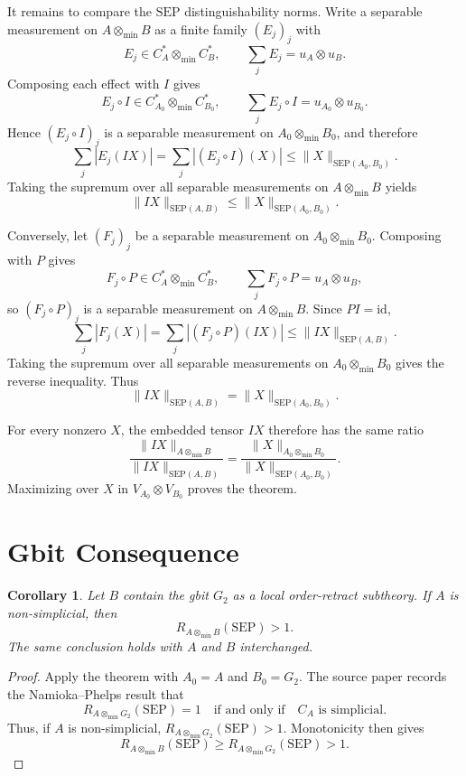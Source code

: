 \documentclass[11pt]{article}
\newtheorem{corollary}{Corollary}
\newcommand{\SEP}{\mathrm{SEP}}
\newcommand{\id}{\mathrm{id}}
\newcommand{\tmin}{\otimes_{\min}}
\newcommand{\Gbit}{G_2}
\begin{document}
It remains to compare the \(\SEP\) distinguishability norms.  Write a
separable measurement on \(A\tmin B\) as a finite family
\((E_j)_j\) with
\[
  E_j\in C_A^*\tmin C_B^*,
  \qquad
  \sum_j E_j=u_A\otimes u_B.
\]
Composing each effect with \(I\) gives
\[
  E_j\circ I \in C_{A_0}^*\tmin C_{B_0}^*,
  \qquad
  \sum_j E_j\circ I=u_{A_0}\otimes u_{B_0}.
\]
Hence \((E_j\circ I)_j\) is a separable measurement on
\(A_0\tmin B_0\), and therefore
\[
  \sum_j |E_j(I X)|
  =
  \sum_j |(E_j\circ I)(X)|
  \le \|X\|_{\SEP(A_0,B_0)}.
\]
Taking the supremum over all separable measurements on \(A\tmin B\) yields
\[
  \|I X\|_{\SEP(A,B)}
  \le
  \|X\|_{\SEP(A_0,B_0)}.
\]

Conversely, let \((F_j)_j\) be a separable measurement on \(A_0\tmin B_0\).
Composing with \(P\) gives
\[
  F_j\circ P \in C_A^*\tmin C_B^*,
  \qquad
  \sum_j F_j\circ P=u_A\otimes u_B,
\]
so \((F_j\circ P)_j\) is a separable measurement on \(A\tmin B\).  Since
\(PI=\id\),
\[
  \sum_j |F_j(X)|
  =
  \sum_j |(F_j\circ P)(I X)|
  \le
  \|I X\|_{\SEP(A,B)}.
\]
Taking the supremum over all separable measurements on \(A_0\tmin B_0\)
gives the reverse inequality.  Thus
\[
  \|I X\|_{\SEP(A,B)}=\|X\|_{\SEP(A_0,B_0)}.
\]

For every nonzero \(X\), the embedded tensor \(I X\) therefore has the same
ratio
\[
  \frac{\|I X\|_{A\tmin B}}{\|I X\|_{\SEP(A,B)}}
  =
  \frac{\|X\|_{A_0\tmin B_0}}{\|X\|_{\SEP(A_0,B_0)}}.
\]
Maximizing over \(X\) in \(V_{A_0}\otimes V_{B_0}\) proves the theorem.

\section*{Gbit Consequence}

\begin{corollary}
Let \(B\) contain the gbit \(\Gbit\) as a local order-retract subtheory.  If
\(A\) is non-simplicial, then
\[
  R_{A\tmin B}(\SEP)>1.
\]
The same conclusion holds with \(A\) and \(B\) interchanged.
\end{corollary}

\begin{proof}
Apply the theorem with \(A_0=A\) and \(B_0=\Gbit\).  The source paper records
the Namioka--Phelps result that
\[
  R_{A\tmin \Gbit}(\SEP)=1
  \quad\text{if and only if}\quad
  C_A \text{ is simplicial}.
\]
Thus, if \(A\) is non-simplicial, \(R_{A\tmin \Gbit}(\SEP)>1\).  Monotonicity
then gives
\[
  R_{A\tmin B}(\SEP)
  \ge
  R_{A\tmin \Gbit}(\SEP)
  >
  1.
\]
\end{proof}
\end{document}
